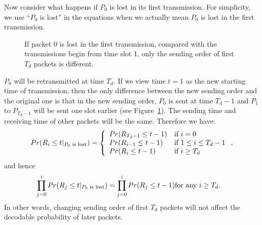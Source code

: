     Now consider what happens if $P_0$ is lost in its first transmission. 
    For simplicity, we use ``$P_0$ is lost'' in the equations when we actually
    mean $P_0$ is lost in the first transmission.
\begin{figure}[htbp]
\centering
{}
\caption{If packet $0$ is lost in the first transmission, compared with the transmissions begin from time slot 1, only the sending order of first $T_d$ packets is different.}\label{f:model:comp}
\end{figure}
    $P_0$ will be retransmitted at time $T_d$. If we view time $t=1$ as
    the new starting time of transmission, then the only difference between the new
    sending order and the original one is that in the new sending order, $P_0$ is
    sent at time $T_d-1$ and $P_1$ to $P_{T_d-1}$ will be 
    sent one slot earlier (see Figure~\ref{f:model:comp}). The sending time 
    and receiving time of other packets will be the same. 
    Therefore we have:
    \begin{eqnarray}
    \label{e:model:p0notreceived}
        Pr(R_i \le t|_{\textrm{$P_0$ is lost}})= \left\{\begin{array}{ll}
        Pr(R_{T_d-1} \le t-1)             & \textrm{if $i = 0$}\\
        Pr(R_{i-1}   \le t-1)             & \textrm{if $1 \le i \le T_d - 1$}\\
        Pr(R_i       \le t-1)             & \textrm{if $i \ge T_d$} \\
        \end{array}\right.,
    \end{eqnarray} 
    and hence
    \begin{eqnarray}
    \label{e:model:equal}
       \prod_{j=0}^{i}Pr(R_j \le t|_{\textrm{$P_0$ is lost}}) = \prod_{j=0}^{i}Pr(R_j \le t-1) & \textrm{for any $i \ge T_d$}.
    \end{eqnarray}
    In other words, changing sending order of first $T_d$ packets will not
    affect the decodable probability of later packets.


